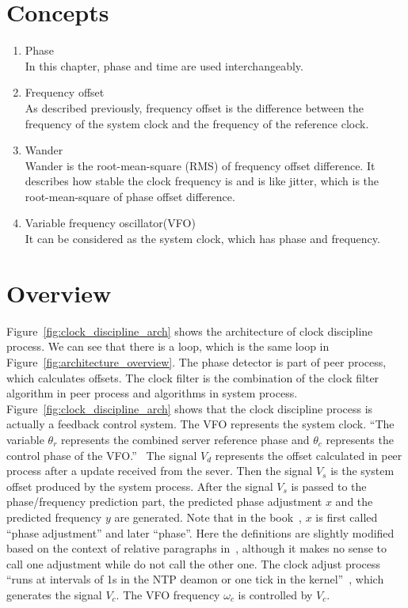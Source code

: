 \section{Concepts}%
\label{sec:clock_discipline_concepts}
\begin{enumerate}
    \item Phase\\
        In this chapter, phase and time are used interchangeably.
    \item Frequency offset\\
        As described previously, frequency offset is the difference between the
        frequency of the system clock and the frequency of the reference clock.
    \item Wander\\
        Wander is the root-mean-square (RMS) of frequency offset difference. It
        describes how stable the clock frequency is and is like jitter, which
        is the root-mean-square of phase offset difference.
    \item Variable frequency oscillator(VFO)\\
        It can be considered as the system clock, which has phase and
        frequency.
\end{enumerate}

\section{Overview}%
\label{sec:clock_discipline_overview}
Figure~\ref{fig:clock_discipline_arch} shows the architecture of clock
discipline process. We can see that there is a loop, which is the same loop in 
Figure~\ref{fig:architecture_overview}. The phase detector is part of peer
process, which calculates offsets. The clock filter is the combination of
the clock filter algorithm in peer process and algorithms in system process.
Figure~\ref{fig:clock_discipline_arch} shows that the clock discipline process
is actually a feedback control system. The VFO represents the system clock.
``The variable $\theta_r$ represents the combined server reference phase and
$\theta_c$ represents the control phase of the VFO.''~\cite{redbook} The signal
$V_d$ represents the offset calculated in peer process after a update received
from the sever. Then the signal $V_s$ is the system offset produced by the
system process. After the signal $V_s$ is passed to the phase/frequency
prediction part, the predicted phase adjustment $x$ and the predicted frequency
$y$ are generated. Note that in the book~\cite{redbook}, $x$ is first called
``phase adjustment'' and later ``phase''. Here the definitions are slightly
modified based on the context of relative paragraphs in~\cite{redbook},
although it makes no sense to call one adjustment while do not call the other
one. The clock adjust process ``runs at intervals of 1s in the NTP deamon or
one tick in the kernel''~\cite{redbook}, which generates the signal $V_c$. The
VFO frequency $\omega_c$ is controlled by $V_c$.

